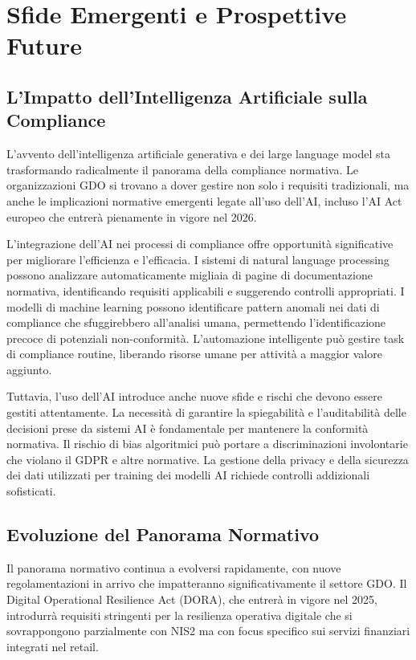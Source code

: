 \section{Sfide Emergenti e Prospettive Future}

\subsection{L'Impatto dell'Intelligenza Artificiale sulla Compliance}

L'avvento dell'intelligenza artificiale generativa e dei large language model sta trasformando radicalmente il panorama della compliance normativa. Le organizzazioni GDO si trovano a dover gestire non solo i requisiti tradizionali, ma anche le implicazioni normative emergenti legate all'uso dell'AI, incluso l'AI Act europeo che entrerà pienamente in vigore nel 2026.

L'integrazione dell'AI nei processi di compliance offre opportunità significative per migliorare l'efficienza e l'efficacia. I sistemi di natural language processing possono analizzare automaticamente migliaia di pagine di documentazione normativa, identificando requisiti applicabili e suggerendo controlli appropriati. I modelli di machine learning possono identificare pattern anomali nei dati di compliance che sfuggirebbero all'analisi umana, permettendo l'identificazione precoce di potenziali non-conformità. L'automazione intelligente può gestire task di compliance routine, liberando risorse umane per attività a maggior valore aggiunto.

Tuttavia, l'uso dell'AI introduce anche nuove sfide e rischi che devono essere gestiti attentamente. La necessità di garantire la spiegabilità e l'auditabilità delle decisioni prese da sistemi AI è fondamentale per mantenere la conformità normativa. Il rischio di bias algoritmici può portare a discriminazioni involontarie che violano il GDPR e altre normative. La gestione della privacy e della sicurezza dei dati utilizzati per training dei modelli AI richiede controlli addizionali sofisticati.

\subsection{Evoluzione del Panorama Normativo}

Il panorama normativo continua a evolversi rapidamente, con nuove regolamentazioni in arrivo che impatteranno significativamente il settore GDO. Il Digital Operational Resilience Act (DORA), che entrerà in vigore nel 2025, introdurrà requisiti stringenti per la resilienza operativa digitale che si sovrappongono parzialmente con NIS2 ma con focus specifico sui servizi finanziari integrati nel retail.

